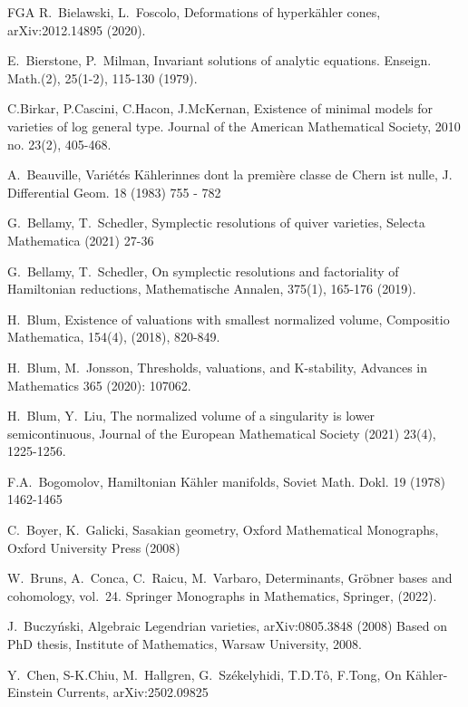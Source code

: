 \documentclass[12pt,a4paper]{amsart}
\theoremstyle{remark}
\theoremstyle{definition}
\begin{document}
\begin{thebibliography}{FGA}
R.~Bielawski, L.~Foscolo, Deformations of hyperk\" ahler cones, arXiv:2012.14895 (2020). 

E.~Bierstone, P.~Milman, Invariant solutions of analytic equations. Enseign. Math.(2), 25(1-2), 115-130 (1979). 

C.Birkar, P.Cascini, C.Hacon, J.McKernan, 
Existence of minimal models for varieties of log general type. Journal of the American Mathematical Society, 2010 no. 23(2), 405-468.


A.~Beauville, Vari\'{e}t\'{e}s K\"{a}hlerinnes dont la 
premi\`{e}re classe de Chern ist nulle, 
J. Differential Geom. 18 (1983) 755 - 782 

G.~Bellamy, T.~Schedler, 
Symplectic resolutions of quiver varieties, 
Selecta Mathematica (2021) 27-36 

G.~Bellamy, T.~Schedler, 
On symplectic resolutions and factoriality of Hamiltonian reductions, 
Mathematische Annalen, 375(1), 165-176 (2019). 

H.~Blum, 
Existence of valuations with smallest normalized volume, 
Compositio Mathematica, 154(4), (2018), 820-849. 

H.~Blum, M.~Jonsson, 
Thresholds, valuations, and K-stability, 
Advances in Mathematics 365 (2020): 107062.

H.~Blum, Y.~Liu, 
The normalized volume of a singularity is lower semicontinuous, 
Journal of the European Mathematical Society (2021) 23(4), 1225-1256.

F.A.~Bogomolov, Hamiltonian K\"ahler manifolds, Soviet Math. Dokl. 19 (1978) 1462-1465

C.~Boyer, K.~Galicki, 
Sasakian geometry, Oxford Mathematical Monographs, Oxford University Press (2008) 

W.~Bruns, 
A.~Conca, 
C.~Raicu, 
M.~Varbaro, 
Determinants, Gr\"obner bases and cohomology, 
vol.\ 24. Springer Monographs in Mathematics, Springer, (2022).

J.~Buczy\'nski, Algebraic Legendrian varieties, arXiv:0805.3848 (2008) Based on PhD thesis,
Institute of Mathematics, Warsaw University, 2008.

Y.~Chen, S-K.Chiu, M.~Hallgren, G.~Sz\'ekelyhidi, T.D.T\^{o}, F.Tong, 
On K\"ahler-Einstein Currents, arXiv:2502.09825


\end{thebibliography}
\end{document}
